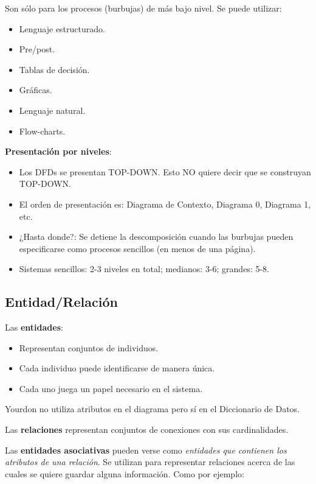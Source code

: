 Son sólo para los procesos (burbujas) de más bajo nivel. Se puede utilizar:

\begin{itemize}[noitemsep]
\item Lenguaje estructurado.
\item Pre/post.
\item Tablas de decisión.
\item Gráficas.
\item Lenguaje natural.
\item Flow-charts.
\end{itemize}

\textbf{Presentación por niveles}:

\begin{itemize}[noitemsep]
\item Los DFDs se presentan TOP-DOWN. Esto NO quiere decir que se construyan TOP-DOWN.
\item El orden de presentación es: Diagrama de Contexto, Diagrama 0, Diagrama 1, etc.
\item ¿Hasta donde?: Se detiene la descomposición cuando las burbujas pueden especificarse como procesos sencillos (en menos de una página).
\item Sistemas sencillos: 2-3 niveles en total; medianos: 3-6; grandes: 5-8.
\end{itemize}


\subsection{Entidad/Relación}

Las \textbf{entidades}:

\begin{itemize}[noitemsep]
\item Representan conjuntos de individuos.
\item Cada individuo puede identificarse de manera única.
\item Cada uno juega un papel necesario en el sistema.
\end{itemize}

Yourdon no utiliza atributos en el diagrama pero sí en el Diccionario de Datos.

Las \textbf{relaciones} representan conjuntos de conexiones con sus cardinalidades.

Las \textbf{entidades asociativas} pueden verse como \textit{entidades que contienen los atributos de una relación}. Se utilizan para representar relaciones acerca de las cuales se quiere guardar alguna información. Como por ejemplo:

